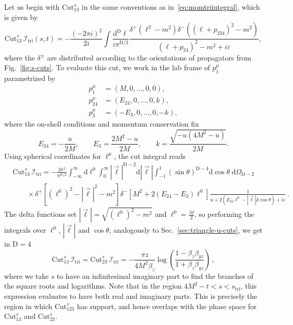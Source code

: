 \documentclass[12pt]{article}
\numberwithin{figure}{section}
\def \be {\begin{equation}}
\def \ee {\end{equation}}
\def \nn {\nonumber}
\def \D {\mathrm{D}}
\def \d {\mathrm{d}}
\def \eps {\varepsilon}
\def \I {\mathcal{I}}
\def \triangle {\mathrm{tri}}
\def \Cut {\mathrm{Cut}}
\begin{document}
    Let us begin with $\Cut_{13}^s$ in the same conventions as in~\eqref{eq:momtriintegral}, which is given by
    \begin{equation}
        \Cut_{13}^s\, \I_{\triangle}(s,t) = -\frac{\left(-2\pi i \right)^2}{2 i}  \int \frac{\d^\D \ell}{i \pi^{\D/2}}   \frac{\delta^+(\ell^2-m^2) \delta^-((\ell+p_{234})^2-m^2)}{(\ell+p_{24})^2-m^2 + i\eps},
    \end{equation}
    where the $\delta^\pm$ are distributed according to the orientations of propagators from Fig.~\ref{fig:s-cuts}. 
    To evaluate this cut, we work in the lab frame of $p_1^\mu$ parametrized by
    \begin{align}
            p_1^\mu & = \left(M,0,\ldots,0,0\right),
            \nn\\
            p_{24}^\mu & = \left(E_{24},0,\ldots,0,k\right), \\
            p_3^\mu & = \left(-E_{3},0,\ldots,0,-k\right),\nn
    \end{align}
    where the on-shell conditions and momentum conservation fix
    \be
    E_{24} = -\frac{u}{2 M},\qquad E_3 =\frac{2 M^2-u}{2 M},\qquad k = \frac{\sqrt{-u(4M^2-u)}}{2 M}.
    \ee
    Using spherical coordinates for $\ell^\mu$, the cut integral reads
    \begin{align}
        &\Cut_{13}^s\, \I_{\triangle} = - \frac{2 \pi^2}{\pi^{\D/2}}
        \int_{-\infty}^{\infty} \d \ell^0 \int_0^\infty |\vec{\ell}|^{\D-2} \d |\vec{\ell}| \int_{-1}^1 \left(\sin \theta\right)^{\D-4} \d \cos \theta \; \d \Omega_{\D-2} 
        \\
        &\qquad\times 
        \delta^+ \left[(\ell^0)^2-|\vec{\ell}|^2-m^2\right]
        \delta^- \left[M^2 + 2(E_{24}{-}E_3) \ell^0 \right] \frac{1}{u+ 2 (E_{24}\ell^0 - |\vec{\ell}| k \cos \theta ) +i \varepsilon} \,.\nn
    \end{align}
    The delta functions set $|\vec{\ell}| = \sqrt{(\ell^0)^2-m^2}$ and $\ell^0=\frac{M}{2}$, so performing the integrals over $\ell^0$, $|\vec{\ell}|$ and $\cos \theta$,  analogously to Sec.~\ref{sec:triangle-u-cuts}, we get in $\D=4$
    \begin{equation}
        \Cut_{13}^s\, \I_{\triangle} = \Cut_{23}^s\, \I_{\triangle}
        =
        - \frac{\pi z}{4 M^2 \beta_z}
        \log \left(
        \frac{1-\beta_z \beta_{yz}}{1+\beta_z \beta_{yz}}
        \right)\,,
    \end{equation}
    where we take $s$ to have an infinitesimal imaginary part to find the branches of the square roots and logarithms.
    Note that in the region $4M^2 {-} t < s < s_\triangle$, this expression evaluates to have both real and imaginary parts. This is precisely the region in which $\Cut_{123}^s$ has support, and hence overlaps with the phase space for $\Cut_{13}^s$ and $\Cut_{23}^s$.
    
\end{document}
